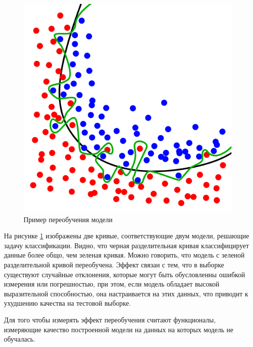 \begin{figure} 
    \vspace{-2ex}
    \includegraphics[width=\linewidth]{src/img/wiki_overfitting.png}
    \caption{Пример переобучения модели }
    \label{fig:wiki_overfitting}
\end{figure}

На рисунке \ref{fig:wiki_overfitting} \cite{wiki:overfitting} изображены две кривые, соответствующие двум модели, решающие задачу классификации. Видно, что черная разделительная кривая классифицирует данные более общо, чем зеленая кривая. Можно говорить, что модель с зеленой разделительной кривой переобучена. Эффект связан с тем, что в выборке существуют случайные отклонения, которые могут быть обусловленны ошибкой измерения или погрешностью, при этом, если модель обладает высокой выразительной способностью, она настраивается на этих данных, что приводит к ухудшению качества на тестовой выборке.

Для того чтобы измерять эффект переобучения считают функционалы, измеряющие качество построенной модели на данных на которых модель не обучалась. 

